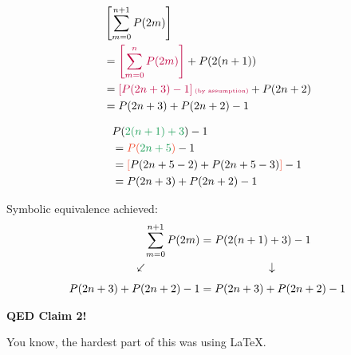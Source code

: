 \documentclass[11pt]{article}
\begin{document}
\begin{table}[h]
   \begin{subtable}[t]{0.45\textwidth}
      \begin{alignat*}{2}
         &\left[\sum_{m=0}^{n+1} P(2m)\right] \\
         &=\textcolor{purple}{\left[\sum_{m=0}^{n} P(2m)\right]}+P(2(n+1)) \\
         &=\textcolor{purple}{\left[P(2n+3)-1\right]\text{\tiny(by assumption)}}+P(2n+2) \\
         &=P(2n+3)+P(2n+2)-1
      \end{alignat*}
   \end{subtable}
   \vline
   \begin{subtable}[t]{0.45\textwidth}
      \begin{alignat*}{2}
         &P(\textcolor{ForestGreen}{2(n+1)+3})-1 \\
         &=\textcolor{RedOrange}{P(\textcolor{ForestGreen}{2n+5})}-1 \\
         &=\textcolor{RedOrange}{\left[\textcolor{black}{P(2n+5-2)+P(2n+5-3)}\right]}-1 \\
         &=P(2n+3)+P(2n+2)-1
      \end{alignat*}
   \end{subtable}
\end{table}

Symbolic equivalence achieved:
\begin{align*}
   \sum_{m=0}^{n + 1} P(2m) &= P(2(n+1)+3)-1 \\
   \rotatebox{50}{$\,\leftarrow$}\phantom{aaaaaaaaa} &\phantom{aaaaaaaaaaaa} \rotatebox{90}{$\,\leftarrow$} \\
   P(2n+3)+P(2n+2)-1 &= P(2n+3)+P(2n+2)-1
\end{align*}

\textbf{QED Claim 2!}

You know, the hardest part of this was using \LaTeX.
\end{document}

